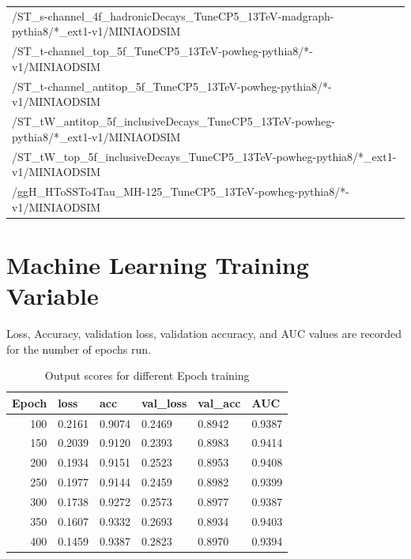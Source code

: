 \begin{table}[htb]
\begin{center}
\begin{tabular}{l}
      /ST\_s-channel\_4f\_hadronicDecays\_TuneCP5\_13TeV-madgraph-pythia8/*\_ext1-v1/MINIAODSIM \\
      /ST\_t-channel\_top\_5f\_TuneCP5\_13TeV-powheg-pythia8/*-v1/MINIAODSIM \\
      /ST\_t-channel\_antitop\_5f\_TuneCP5\_13TeV-powheg-pythia8/*-v1/MINIAODSIM \\
      /ST\_tW\_antitop\_5f\_inclusiveDecays\_TuneCP5\_13TeV-powheg-pythia8/*\_ext1-v1/MINIAODSIM \\
      /ST\_tW\_top\_5f\_inclusiveDecays\_TuneCP5\_13TeV-powheg-pythia8/*\_ext1-v1/MINIAODSIM \\
      \hline
      /ggH\_HToSSTo4Tau\_MH-125\_TuneCP5\_13TeV-powheg-pythia8/*-v1/MINIAODSIM\\
      \hline
    \end{tabular}
    \label{tab:18samplesummary}
  \end{center}
\end{table}

\chapter{Machine Learning Training Variable}

Loss, Accuracy, validation loss, validation accuracy, and AUC values are recorded for the number of epochs run.

\begin{table}[htb]
\caption{Output scores for different Epoch training}
\begin{center}
\begin{tabular}{r|l|l|l|l|l}\hline
Epoch &  loss & acc &  val\_loss & val\_acc & AUC\\
\hline
100& 0.2161 & 0.9074 & 0.2469 & 0.8942 & 0.9387\\
150& 0.2039 & 0.9120 & 0.2393 & 0.8983 & 0.9414\\
200& 0.1934 & 0.9151 & 0.2523 & 0.8953 & 0.9408\\
250& 0.1977 & 0.9144 & 0.2459 & 0.8982 & 0.9399\\
300& 0.1738 & 0.9272 & 0.2573 & 0.8977 & 0.9387\\
350& 0.1607 & 0.9332 & 0.2693 & 0.8934 & 0.9403\\
400& 0.1459 & 0.9387 & 0.2823 & 0.8970 & 0.9394\\
\hline
\end{tabular}
\label{tab:Epoch Training}
\end{center}
\end{table}

